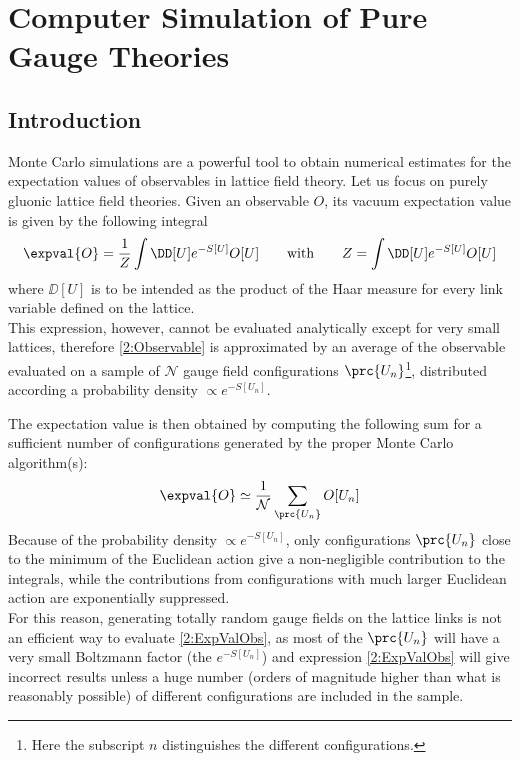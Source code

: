 \pagestyle{myFancy}
\chapter{Computer Simulation of Pure Gauge Theories\label{Chap:GaugeSim}}
\section{Introduction}
Monte Carlo simulations are a powerful tool to obtain numerical estimates for the expectation values of observables in lattice field theory. Let us focus on purely gluonic lattice field theories. Given an observable $O$, its vacuum expectation value is given by the following integral
\begin{equation}
    \expval{O} = \frac1Z\int\DD[U]e^{-S[U]}O[U] \qquad \text{with} \qquad Z = \int\DD[U]e^{-S[U]}O[U] \label{2:Observable}
\end{equation}
where $\DD[U]$ is to be intended as the product of the Haar measure for every link variable defined on the lattice.\\
This expression, however, cannot be evaluated analytically except for very small lattices, therefore \eqref{2:Observable} is approximated by an average of the observable evaluated on a sample of $\mathcal{N}$ gauge field configurations $\prc{U_n}$\footnote{Here the subscript $n$ distinguishes the different configurations.}, distributed according a probability density $\varpropto e^{-S[U_n]}$.

The expectation value is then obtained by computing the following sum for a sufficient number of configurations generated by the proper Monte Carlo algorithm(s):
\begin{equation}
    \expval{O} \simeq \frac{1}{\mathcal{N}} \sum_{\prc{U_n}}O[U_n] \label{2:ExpValObs}
\end{equation}
Because of the probability density $\varpropto e^{-S[U_n]}$, only configurations $\prc{U_n}$ close to the minimum of the Euclidean action give a non-negligible contribution to the integrals, while the contributions from  configurations with much larger Euclidean action are exponentially suppressed.\\
For this reason, generating totally random gauge fields on the lattice links is not an efficient way to evaluate \eqref{2:ExpValObs}, as most of the $\prc{U_n}$ will have a very small Boltzmann factor (the $e^{-S[U_n]}$) and expression \eqref{2:ExpValObs} will give incorrect results unless a huge number (orders of magnitude higher than what is reasonably possible) of different configurations are included in the sample.

